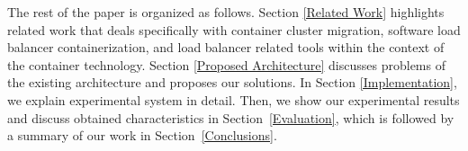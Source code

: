 The rest of the paper is organized as follows.
Section \ref{Related Work} highlights related work that deals specifically with container cluster migration,
software load balancer containerization, and load balancer related tools within the context of the container technology.
Section \ref{Proposed Architecture} discusses problems of the existing architecture and proposes our solutions.
In Section \ref{Implementation}, we explain experimental system in detail.
Then, we show our experimental results and discuss obtained characteristics in Section~\ref{Evaluation}, which is followed by a summary of our work in Section~\ref{Conclusions}.





